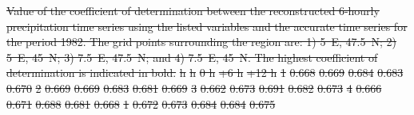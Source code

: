 \documentclass[hess, manuscript]{copernicus}
\providecommand{\DIFdel}[1]{{\protect\color{red}\sout{#1}}}                      %
\providecommand{\DIFdelFL}[1]{\DIFdel{#1}} %
\begin{document}
\begin{table}[htb]
{%
\DIFdelFL{Value of the coefficient of determination between the reconstructed 6-hourly precipitation time series using the listed variables and the accurate time series for the period 1982\textendash 2007. The grid points surrounding the region are: 1) 5\textdegree\ E, 47.5\textdegree\ N; 2) 5\textdegree\ E, 45\textdegree\ N; 3) 7.5\textdegree\ E, 47.5\textdegree\ N; and 4) 7.5\textdegree\ E, 45\textdegree\ N. The highest coefficient of determination is indicated in bold.}}
\DIFdelFL{ h }%
\DIFdelFL{ h }%
\DIFdelFL{0 h }%
\DIFdelFL{+6 h }%
\DIFdelFL{+12 h }%
\DIFdelFL{1 }%
\DIFdelFL{0.668 }%
\DIFdelFL{0.669 }%
\DIFdelFL{0.684 }%
\DIFdelFL{0.683 }%
\DIFdelFL{0.670 }%
\DIFdelFL{2 }%
\DIFdelFL{0.669 }%
\DIFdelFL{0.669 }%
\DIFdelFL{0.683 }%
\DIFdelFL{0.681 }%
\DIFdelFL{0.669 }%
\DIFdelFL{3 }%
\DIFdelFL{0.662 }%
\DIFdelFL{0.673 }%
\DIFdelFL{0.691 }%
\DIFdelFL{0.682 }%
\DIFdelFL{0.673 }%
\DIFdelFL{4 }%
\DIFdelFL{0.666 }%
\DIFdelFL{0.671 }%
\DIFdelFL{0.688 }%
\DIFdelFL{0.681 }%
\DIFdelFL{0.668 }%
\DIFdelFL{1 }%
\DIFdelFL{0.672 }%
\DIFdelFL{0.673 }%
\DIFdelFL{0.684 }%
\DIFdelFL{0.684 }%
\DIFdelFL{0.675 }%

\end{table}
\end{document}
